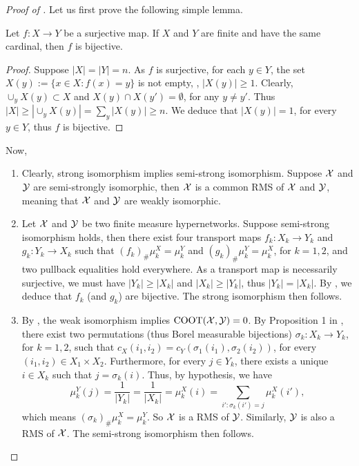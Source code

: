 \begin{proof}[Proof of ]
Let us first prove the following simple lemma.
\begin{lemma} \label{lemma:bijection}
  Let $f: X \to Y$ be a surjective map. If $X$ and $Y$ are finite and have the same cardinal,
  then $f$ is bijective.
\end{lemma}
\begin{proof}
  Suppose $| X | = | Y | = n$. As $f$ is surjective, for each $y \in Y$,
  the set $X(y) := \{ x \in X: f(x) = y \}$ is not empty, \ie, $| X(y) | \geq 1$.
  Clearly, $\cup_y X(y) \subset X$ and $X(y) \cap X(y') = \emptyset$, for any $y \neq y'$.
  Thus $| X | \geq | \cup_y X(y) | = \sum_y |X(y)| \geq n$.
  We deduce that $|X(y)| = 1$, for every $y \in Y$, thus $f$ is bijective.
\end{proof}
Now,
\begin{enumerate}
  \item Clearly, strong isomorphism implies semi-strong isomorphism.
  Suppose $\mathcal X$ and $\mathcal Y$ are semi-strongly isomorphic, then $\mathcal X$ is a common RMS of
  $\mathcal X$ and $\mathcal Y$, meaning that $\mathcal X$ and $\mathcal Y$ are weakly isomorphic.

  \item Let $\mathcal X$ and $\mathcal Y$ be two finite measure hypernetworks.
  Suppose semi-strong isomorphism holds, then there exist four transport maps
  $f_k: X_k \to Y_k$ and $g_k: Y_k \to X_k$ such that $(f_k)_{\#} \mu_k^X = \mu_k^Y$ and
  $(g_k)_{\#} \mu_k^Y = \mu_k^X$, for $k=1,2$, and two pullback equalities hold everywhere.
  As a transport map is necessarily surjective, we must have $| Y_k | \geq | X_k|$
  and $| X_k | \geq | Y_k|$, thus $| Y_k | = | X_k|$. By ,
  we deduce that $f_k$ (and $g_k$) are bijective. The strong isomorphism then follows.

  \item By , the weak isomorphism implies $\text{COOT}(\mathcal X, \mathcal Y) = 0$.
  By Proposition 1 in \citep{Redko20}, there exist two permutations (thus Borel measurable bijections)
  $\sigma_k: X_k \to Y_k$, for $k=1,2$, such that $c_X(i_1,i_2) = c_Y(\sigma_1(i_1), \sigma_2(i_2))$,
  for every $(i_1,i_2) \in X_1 \times X_2$. Furthermore, for every $j \in Y_k$,
  there exists a unique $i \in X_k$ such that $j = \sigma_k(i)$. Thus, by hypothesis, we have
  \begin{equation}
    \mu_k^Y(j) = \frac{1}{\vert Y_k \vert} = \frac{1}{\vert X_k \vert} =
    \mu_k^X(i) = \sum_{i': \sigma_k(i') = j} \mu_k^X(i'),
  \end{equation}
  which means $(\sigma_k)_{\#} \mu_k^X = \mu_k^Y$. So $\mathcal X$ is a RMS of $\mathcal Y$. Similarly,
  $\mathcal Y$ is also a RMS of $\mathcal X$. The semi-strong isomorphism then follows.
\end{enumerate}
\end{proof}

